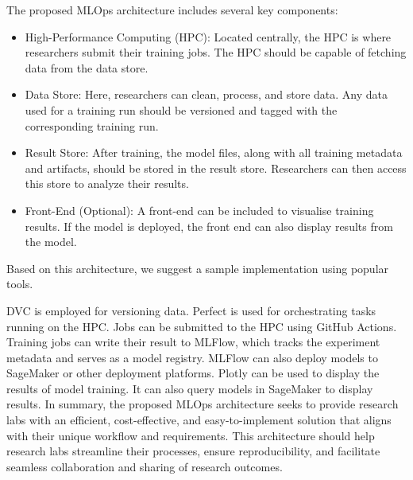 The proposed MLOps architecture includes several key components:

\begin{itemize}
    \item High-Performance Computing (HPC): Located centrally, the HPC is where researchers submit their training jobs. The HPC should be capable of fetching data from the data store.
    \item Data Store: Here, researchers can clean, process, and store data. Any data used for a training run should be versioned and tagged with the corresponding training run.
    \item Result Store: After training, the model files, along with all training metadata and artifacts, should be stored in the result store. Researchers can then access this store to analyze their results.
    \item Front-End (Optional): A front-end can be included to visualise training results. If the model is deployed, the front end can also display results from the model.
\end{itemize}

Based on this architecture, we suggest a sample implementation using popular tools.

DVC is employed for versioning data.
Perfect is used for orchestrating tasks running on the HPC.
Jobs can be submitted to the HPC using GitHub Actions.
Training jobs can write their result to MLFlow, which tracks the experiment metadata and serves as a model registry.
MLFlow can also deploy models to SageMaker or other deployment platforms.
Plotly can be used to display the results of model training. It can also query models in SageMaker to display results.
In summary, the proposed MLOps architecture seeks to provide research labs with an efficient, cost-effective, and easy-to-implement solution that aligns with their unique workflow and requirements. This architecture should help research labs streamline their processes, ensure reproducibility, and facilitate seamless collaboration and sharing of research outcomes.